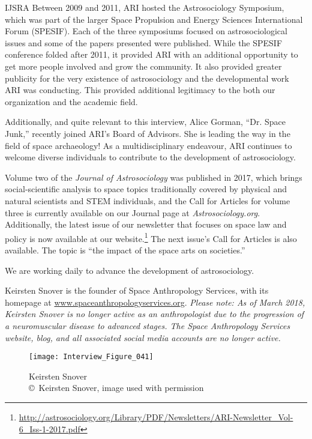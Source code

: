 \begin{labeling}{IJSRA}
	Between 2009 and 2011, ARI hosted the Astrosociology Symposium, which was part of the larger Space Propulsion and Energy Sciences International Forum (SPESIF). Each of the three symposiums focused on astrosociological issues and some of the papers presented were published. While the SPESIF conference folded after 2011, it provided ARI with an additional opportunity to get more people involved and grow the community. It also provided greater publicity for the very existence of astrosociology and the developmental work ARI was conducting. This provided additional legitimacy to the both our organization and the academic field.

	Additionally, and quite relevant to this interview, Alice Gorman, “Dr. Space Junk,” recently joined ARI’s Board of Advisors. She is leading the way in the field of space archaeology! As a multidisciplinary endeavour, ARI continues to welcome diverse individuals to contribute to the development of astrosociology.

	Volume two of the \emph{Journal of Astrosociology} was published in 2017, which brings social-scientific analysis to space topics traditionally covered by physical and natural scientists and STEM individuals, and the Call for Articles for volume three is currently available on our Journal page at \emph{Astrosociology.org}. Additionally, the latest issue of our newsletter that focuses on space law and policy is now available at our website.\footnote{\url{http://astrosociology.org/Library/PDF/Newsletters/ARI-Newsletter_Vol-6_Iss-1-2017.pdf}} The next issue’s Call for Articles is also available. The topic is “the impact of the space arts on societies.”

	We are working daily to advance the development of astrosociology.

\end{labeling}

\IJSRAseparator


Keirsten Snover is the founder of Space Anthropology Services, with its homepage at \href{www.spaceanthropologyservices.org}{www.spaceanthropologyservices.org}. \emph{Please note: As of March 2018, Keirsten Snover is no longer active as an anthropologist due to the progression of a neuromuscular disease to advanced stages. The Space Anthropology Services website, blog, and all associated social media accounts are no longer active.}

\begin{figure}[!htb]
	\texttt{[image: Interview\_Figure\_041]}
	\centering
	\caption{Keirsten Snover
		{\normalfont\scriptsize \\ \copyright\ Keirsten Snover, image used with permission
	}}
	\label{Interview_Figure_041}
\end{figure}

